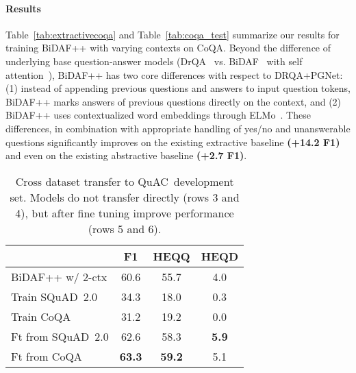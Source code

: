 \documentclass[11pt,a4paper]{article}
\newcommand{\quact}[0]{QuAC}
\newcommand{\coqa}[0]{CoQA}
\newcommand{\squad}[0]{SQuAD~2.0}
\begin{document}
\paragraph{Results} Table~\ref{tab:extractivecoqa} and Table~\ref{tab:coqa_test} summarize our results for training BiDAF++ with varying contexts on \coqa.
Beyond the difference of underlying base question-answer models (DrQA~\cite{chen2017reading} vs. BiDAF~\cite{seo2016bidirectional} with self attention~\cite{clark2017simple}), BiDAF++ has two core differences with respect to DRQA+PGNet: (1) instead of appending previous questions and answers to input question tokens, BiDAF++ marks answers of previous questions directly on the context, and (2) BiDAF++ uses contextualized word embeddings through ELMo~\cite{peters2018deep}. These differences, in combination with appropriate handling of yes/no and unanswerable questions significantly improves on the existing extractive baseline {\bf (+14.2 F1)} and even on the existing abstractive baseline {\bf (+2.7 F1)}.






 
\begin{table}[t]
 \small

    \centering
    \begin{tabular}{l|c|c|c}
    
     & F1 & HEQQ & HEQD \\
    \midrule
    BiDAF++ w/ 2-ctx & 60.6    & 55.7  &  4.0  \\
    \midrule 
    Train \squad & 34.3  & 18.0 & 0.3 \\
    Train \coqa & 31.2  & 19.2 & 0.0  \\
    Ft from \squad & 62.6  & 58.3  & \bf{5.9}  \\
    Ft from \coqa & \bf{63.3}  & \bf{59.2} & 5.1 \\
    \end{tabular}
    \vspace{-7pt}
    \caption{Cross dataset transfer to \quact~development set. Models do not transfer directly (rows 3 and 4), but after fine tuning improve performance (rows 5 and 6).}
        \vspace{-7pt}

    \label{tab:quac_experiments}
\end{table}
\end{document}
